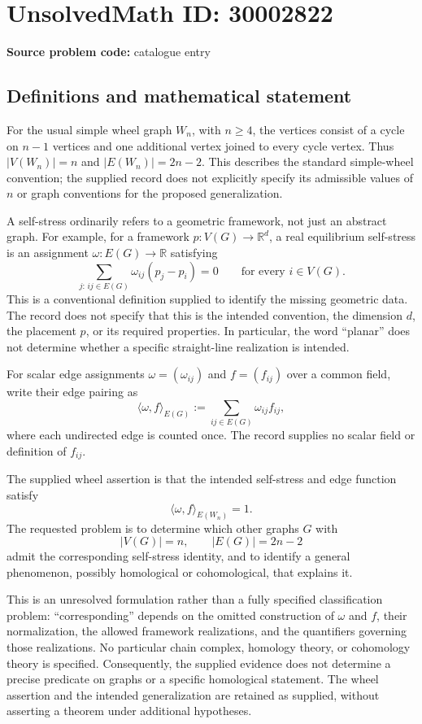 \documentclass[11pt]{article}
\newcommand{\R}{\mathbb{R}}
\begin{document}
\section*{UnsolvedMath ID: 30002822}
\textbf{Source problem code:} catalogue entry
\subsection{Definitions and mathematical statement}
For the usual simple wheel graph \(W_n\), with \(n\geq 4\), the vertices consist of a cycle on \(n-1\) vertices and one additional vertex joined to every cycle vertex. Thus \(|V(W_n)|=n\) and \(|E(W_n)|=2n-2\). This describes the standard simple-wheel convention; the supplied record does not explicitly specify its admissible values of \(n\) or graph conventions for the proposed generalization.

A self-stress ordinarily refers to a geometric framework, not just an abstract graph. For example, for a framework \(p:V(G)\to\R^d\), a real equilibrium self-stress is an assignment \(\omega:E(G)\to\R\) satisfying
\[
\sum_{j:\,ij\in E(G)}\omega_{ij}(p_j-p_i)=0
\qquad\text{for every }i\in V(G).
\]
This is a conventional definition supplied to identify the missing geometric data. The record does not specify that this is the intended convention, the dimension \(d\), the placement \(p\), or its required properties. In particular, the word ``planar'' does not determine whether a specific straight-line realization is intended.

For scalar edge assignments \(\omega=(\omega_{ij})\) and \(f=(f_{ij})\) over a common field, write their edge pairing as
\[
\langle\omega,f\rangle_{E(G)}
:=\sum_{ij\in E(G)}\omega_{ij}f_{ij},
\]
where each undirected edge is counted once. The record supplies no scalar field or definition of \(f_{ij}\).

The supplied wheel assertion is that the intended self-stress and edge function satisfy
\[
\langle\omega,f\rangle_{E(W_n)}=1.
\]
The requested problem is to determine which other graphs \(G\) with
\[
|V(G)|=n,\qquad |E(G)|=2n-2
\]
admit the corresponding self-stress identity, and to identify a general phenomenon, possibly homological or cohomological, that explains it.

This is an unresolved formulation rather than a fully specified classification problem: ``corresponding'' depends on the omitted construction of \(\omega\) and \(f\), their normalization, the allowed framework realizations, and the quantifiers governing those realizations. No particular chain complex, homology theory, or cohomology theory is specified. Consequently, the supplied evidence does not determine a precise predicate on graphs or a specific homological statement. The wheel assertion and the intended generalization are retained as supplied, without asserting a theorem under additional hypotheses.
\end{document}
